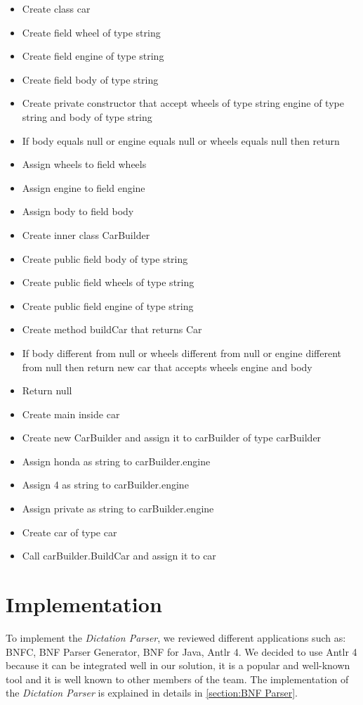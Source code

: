 \begin{itemize} \label{itemize:Car Builder Dictation}
	\item Create class car
	\item Create field wheel of type string
	\item Create field engine of type string
	\item Create field body of type string
	\item Create private constructor that accept wheels of type string engine of type string and body of type string
	\item If body equals null or engine equals null or wheels equals null then return	
	\item Assign wheels to field wheels
	\item Assign engine to field engine
	\item Assign body to field body
	\item Create inner class CarBuilder
	\item Create public field body of type string
	\item Create public field wheels of type string
	\item Create public field engine of type string
	\item Create method buildCar that returns Car
	\item If body different from null or wheels different from null or engine different from null then return new car that accepts wheels engine and body
	\item Return null
	\item Create main inside car
	\item Create new CarBuilder and assign it to carBuilder of type carBuilder
	\item Assign honda as string to carBuilder.engine
	\item Assign 4 as string to carBuilder.engine
	\item Assign private as string to carBuilder.engine
	\item Create car of type car
	\item Call carBuilder.BuildCar and assign it to car
\end{itemize}
\section{Implementation}
To implement the \textit{Dictation Parser}, we reviewed different applications such as: BNFC, BNF Parser Generator, BNF for Java, Antlr 4. We decided to use Antlr 4 because it can be integrated well in our solution, it is a popular and well-known tool and it is well known to other members of the team. The implementation of the \textit{Dictation Parser} is explained in details in \ref{section:BNF Parser}.